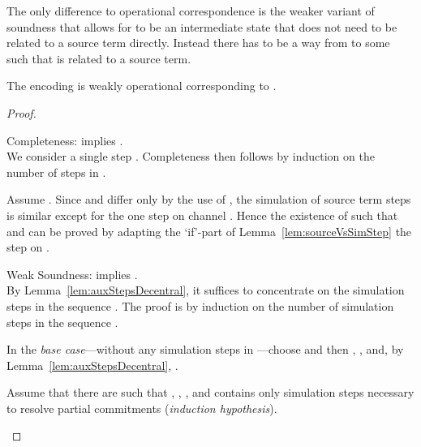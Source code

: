 \documentclass[]{eptcs}
\begin{document}
The only difference to operational correspondence is the weaker variant of soundness that allows for  to be an intermediate state that does not need to be related to a source term directly. Instead there has to be a way from  to some  such that  is related to a source term.

\begin{theorem}
	The encoding  is weakly operational corresponding \wrt to .
	\label{thm:operationalCorrespondenceDecentral}
\end{theorem}

\begin{proof}
	\begin{compactitem}
		\item[Completeness:]  implies .\\
			We consider a single step . Completeness then follows by induction on the number of steps in .
			
			Assume . Since  and  differ only by the use of , the simulation of source term steps is similar except for the one step on channel . Hence the existence of  such that  and  can be proved by adapting the `if'-part of Lemma~\ref{lem:sourceVsSimStep} \wrt the step on .
		\item[Weak Soundness:]  implies .\\
			By Lemma~\ref{lem:auxStepsDecentral}, it suffices to concentrate on the simulation steps in the sequence . The proof is by induction on the number of simulation steps in the sequence .
			
			In the \emph{base case}---without any simulation steps in ---choose  and  then , , and, by Lemma~\ref{lem:auxStepsDecentral}, .
			
			Assume that there are  such that , , , and  contains only simulation steps necessary to resolve partial commitments (\emph{induction hypothesis}).
			

\end{compactitem}
\end{proof}
\end{document}

